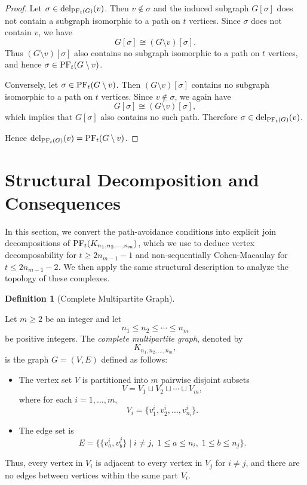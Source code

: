 \documentclass[12pt,reqno]{amsart}
\theoremstyle{definition}
\newtheorem{definition}[definition]{Definition}
\newcommand{\del}{{\mathrm{del}}}
\newcommand{\PF}{{\rm PF}}
\begin{document}
\begin{proof}
Let $\sigma \in \del_{\PF_t(G)}(v)$. Then $v \notin \sigma$ and the induced subgraph $G[\sigma]$ does not contain a subgraph isomorphic to a path on $t$ vertices. Since $\sigma$ does not contain $v$, we have
\[
G[\sigma] \cong (G \setminus v)[\sigma].
\]
Thus $(G \setminus v)[\sigma]$ also contains no subgraph isomorphic to a path on $t$ vertices, and hence $\sigma \in \PF_t(G \setminus v)$.

Conversely, let $\sigma \in \PF_t(G \setminus v)$. Then $(G \setminus v)[\sigma]$ contains no subgraph isomorphic to a path on $t$ vertices. Since $v \notin \sigma$, we again have
\[
G[\sigma] \cong (G \setminus v)[\sigma],
\]
which implies that $G[\sigma]$ also contains no such path. Therefore $\sigma \in \del_{\PF_t(G)}(v)$.

Hence $\del_{\PF_t(G)}(v) = \PF_t(G \setminus v)$.
\end{proof}

\section{Structural Decomposition and Consequences }\label{sec: CMG}

In this section, we convert the path-avoidance conditions into explicit join decompositions of $\PF_t(K_{n_1,n_2,\ldots,n_m})$, which we use to deduce vertex decomposability for $t \ge 2n_{m-1}-1$ and non-sequentially Cohen-Macaulay for $t \le 2n_{m-1}-2$. We then apply the same structural description to analyze the topology of these complexes.

\begin{definition}[Complete Multipartite Graph]\label{def: CMG}

Let $m \ge 2$ be an integer and let 
\[
n_1 \le n_2 \le \cdots \le n_m
\]
be positive integers. The \emph{complete multipartite graph}, denoted by 
\[
K_{n_1, n_2, \dots, n_m},
\]
is the graph $G=(V,E)$ defined as follows:

\begin{itemize}
    \item The vertex set $V$ is partitioned into $m$ pairwise disjoint subsets
    \[
    V = V_1 \sqcup V_2 \sqcup \cdots \sqcup V_m,
    \]
    where for each $i=1,\dots,m$,
    \[
    V_i = \{v_1^i, v_2^i, \dots, v_{n_i}^i\}.
    \]

    \item The edge set is
    \[
    E = \big\{ \{v_a^i, v_b^j\} \;\big|\; i \ne j,\; 1 \le a \le n_i,\; 1 \le b \le n_j \big\}.
    \]
\end{itemize}

Thus, every vertex in $V_i$ is adjacent to every vertex in $V_j$ for $i \neq j$, and there are no edges between vertices within the same part $V_i$.
\end{definition}
\end{document}

